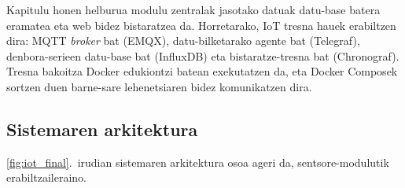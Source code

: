 \documentclass[10pt]{article}
\begin{document}
Kapitulu honen helburua modulu zentralak jasotako datuak datu-base batera eramatea eta web bidez bistaratzea da. Horretarako, \ac{IoT} tresna hauek erabiltzen dira: \ac{MQTT} \textit{broker} bat (EMQX), datu-bilketarako agente bat (Telegraf), denbora-serieen datu-base bat (InfluxDB) eta bistaratze-tresna bat (Chronograf). Tresna bakoitza Docker edukiontzi batean exekutatzen da, eta Docker Composek sortzen duen barne-sare lehenetsiaren bidez komunikatzen dira.\\

\subsection{Sistemaren arkitektura}

\ref{fig:iot_final}.~irudian sistemaren arkitektura osoa ageri da, sentsore-modulutik erabiltzaileraino.
\end{document}
